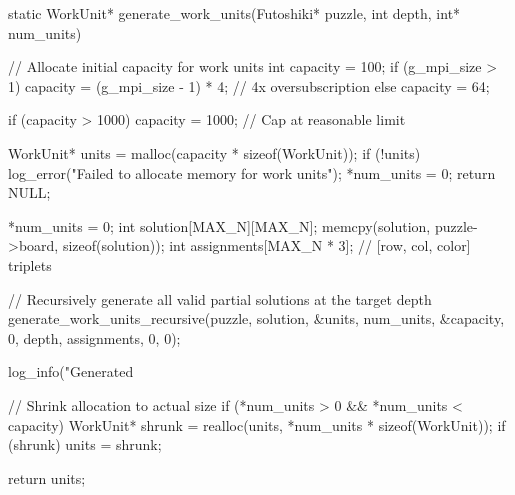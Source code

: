 static WorkUnit* generate_work_units(Futoshiki* puzzle, int depth, int* num_units) {
    // Allocate initial capacity for work units
    int capacity = 100;
    if (g_mpi_size > 1)
        capacity = (g_mpi_size - 1) * 4;  // 4x oversubscription
    else
        capacity = 64;
    
    if (capacity > 1000) capacity = 1000;  // Cap at reasonable limit
    
    WorkUnit* units = malloc(capacity * sizeof(WorkUnit));
    if (!units) {
        log_error("Failed to allocate memory for work units");
        *num_units = 0;
        return NULL;
    }
    
    *num_units = 0;
    int solution[MAX_N][MAX_N];
    memcpy(solution, puzzle->board, sizeof(solution));
    int assignments[MAX_N * 3];  // [row, col, color] triplets
    
    // Recursively generate all valid partial solutions at the target depth
    generate_work_units_recursive(puzzle, solution, &units, num_units, 
                                 &capacity, 0, depth, assignments, 0, 0);
    
    log_info("Generated %
    
    // Shrink allocation to actual size
    if (*num_units > 0 && *num_units < capacity) {
        WorkUnit* shrunk = realloc(units, *num_units * sizeof(WorkUnit));
        if (shrunk) units = shrunk;
    }
    
    return units;
}